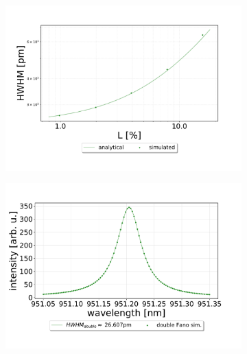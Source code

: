 \begin{figure}[h!]
    \centering
    \begin{subfigure}[c]{0.7\textwidth}
        \centering
        \includegraphics[width=\textwidth]{figures/linewidth_vs_losses.pdf}
        \caption{}
        \label{fig:HWHM_vs_losses}
    \end{subfigure}
    \begin{subfigure}[c]{0.49\textwidth}
        \includegraphics[width=\textwidth]{figures/double_1percent_loss_30um.pdf}
        \caption{}
        \label{fig:lossy_spectrum_0.2percent}
    \end{subfigure}
    \begin{subfigure}[c]{0.49\textwidth}

\end{subfigure}
\end{figure}
